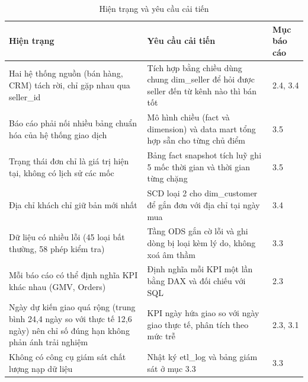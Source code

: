 \begin{table}[htbp]\centering\scriptsize\caption{Hiện trạng và yêu cầu cải tiến}\label{tab:hien-trang}
\begin{tabular}{p{6.08cm}p{6.65cm}p{1.71cm}}\toprule
\textbf{Hiện trạng} & \textbf{Yêu cầu cải tiến} & \textbf{Mục báo cáo}\\\midrule
Hai hệ thống nguồn (bán hàng, CRM) tách rời, chỉ gặp nhau qua seller\_id & Tích hợp bằng chiều dùng chung dim\_seller để hỏi được seller đến từ kênh nào thì bán tốt & 2.4, 3.4\\
Báo cáo phải nối nhiều bảng chuẩn hóa của hệ thống giao dịch & Mô hình chiều (fact và dimension) và data mart tổng hợp sẵn cho từng chủ điểm & 3.5\\
Trạng thái đơn chỉ là giá trị hiện tại, không có lịch sử các mốc & Bảng fact snapshot tích luỹ ghi 5 mốc thời gian và thời gian từng chặng & 3.5\\
Địa chỉ khách chỉ giữ bản mới nhất & SCD loại 2 cho dim\_customer để gắn đơn với địa chỉ tại ngày mua & 3.4\\
Dữ liệu có nhiều lỗi (45 loại bất thường, 58 phép kiểm tra) & Tầng ODS gắn cờ lỗi và ghi dòng bị loại kèm lý do, không xoá âm thầm & 3.3\\
Mỗi báo cáo có thể định nghĩa KPI khác nhau (GMV, Orders) & Định nghĩa mỗi KPI một lần bằng DAX và đối chiếu với SQL & 2.3\\
Ngày dự kiến giao quá rộng (trung bình 24,4 ngày so với thực tế 12,6 ngày) nên chỉ số đúng hạn không phản ánh trải nghiệm & KPI ngày hứa giao so với ngày giao thực tế, phân tích theo mức trễ & 2.3, 3.1\\
Không có công cụ giám sát chất lượng nạp dữ liệu & Nhật ký etl\_log và bảng giám sát ở mục 3.3 & 3.3\\
\bottomrule\end{tabular}\end{table}
